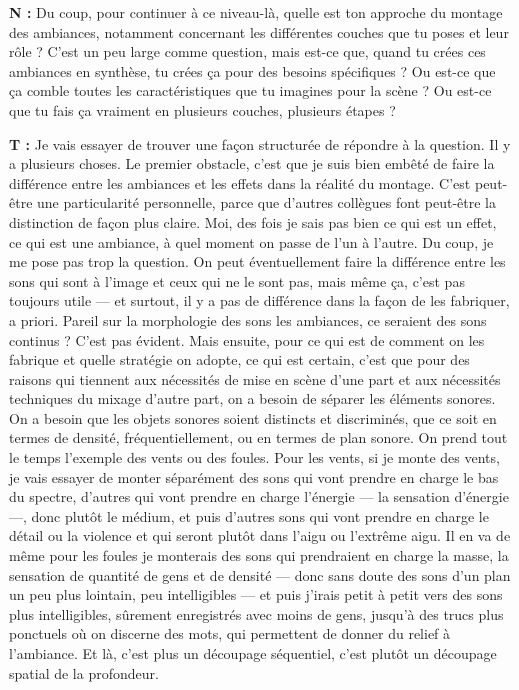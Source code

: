﻿\documentclass[12pt]{article}
\begin{document}
\textbf{N :} Du coup, pour continuer à ce niveau-là, quelle est ton approche du montage des ambiances, notamment concernant les différentes couches que tu poses et leur rôle ? C'est un peu large comme question, mais est-ce que, quand tu crées ces ambiances en synthèse, tu crées ça pour des besoins spécifiques ? Ou est-ce que ça comble toutes les caractéristiques que tu imagines pour la scène ? Ou est-ce que tu fais ça vraiment en plusieurs couches, plusieurs étapes ? 

\textbf{T :} Je vais essayer de trouver une façon structurée de répondre à la question. Il y a plusieurs choses. Le premier obstacle, c'est que je suis bien embêté de faire la différence entre les ambiances et les effets dans la réalité du montage. C'est peut-être une particularité personnelle, parce que d'autres collègues font peut-être la distinction de façon plus claire. Moi, des fois je sais pas bien ce qui est un effet, ce qui est une ambiance, à quel moment on passe de l'un à l'autre. Du coup, je me pose pas trop la question. On peut éventuellement faire la différence entre les sons qui sont à l'image et ceux qui ne le sont pas, mais même ça, c'est pas toujours utile — et surtout, il y a pas de différence dans la façon de les fabriquer, a priori. Pareil sur la morphologie des sons les ambiances, ce seraient des sons continus ? C'est pas évident. 
Mais ensuite, pour ce qui est de comment on les fabrique et quelle stratégie on adopte, ce qui est certain, c'est que pour des raisons qui tiennent aux nécessités de mise en scène d'une part et aux nécessités techniques du mixage d'autre part, on a besoin de séparer les éléments sonores. On a besoin que les objets sonores soient distincts et discriminés, que ce soit en termes de densité, fréquentiellement, ou en termes de plan sonore. On prend tout le temps l'exemple des vents ou des foules. Pour les vents, si je monte des vents, je vais essayer de monter séparément des sons qui vont prendre en charge le bas du spectre, d'autres qui vont prendre en charge l'énergie — la sensation d'énergie —, donc plutôt le médium, et puis d'autres sons qui vont prendre en charge le détail ou la violence et qui seront plutôt dans l'aigu ou l'extrême aigu. Il en va de même pour les foules je monterais des sons qui prendraient en charge la masse, la sensation de quantité de gens et de densité — donc sans doute des sons d'un plan un peu plus lointain, peu intelligibles — et puis j'irais petit à petit vers des sons plus intelligibles, sûrement enregistrés avec moins de gens, jusqu'à des trucs plus ponctuels où on discerne des mots, qui permettent de donner du relief à l'ambiance. Et là, c'est plus un découpage séquentiel, c'est plutôt un découpage spatial de la profondeur. 
\end{document}
